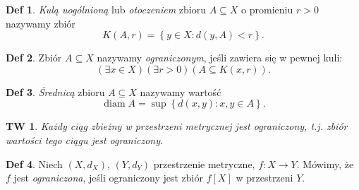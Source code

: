 \documentclass[a4paper, 12pt]{mwart}
\DeclareMathOperator{\diam}{diam}
\theoremstyle{definition}
\newtheorem{definicja}{Def}[section]
\theoremstyle{plain}
\newtheorem{twierdzenie}{TW}[section]
\theoremstyle{remark}
\begin{document}
\begin{definicja}
	\emph{Kulą uogólnioną} lub \emph{otoczeniem} zbioru $A \subseteq X$ o promieniu $r > 0$ nazywamy zbiór
	\begin{equation}
		K(A, r) = \left\{y \in X\colon d(y, A) < r\right\}.
	\end{equation}
\end{definicja}
\begin{definicja}
	Zbiór $A \subseteq X$ nazywamy \emph{ograniczonym}, jeśli zawiera się w pewnej kuli:
	\begin{equation}
		\left(\exists x \in X\right)\left(\exists r > 0\right)\left(A \subseteq K(x, r)\right).
	\end{equation}
\end{definicja}
\begin{definicja}
	\emph{Średnicą} zbioru $A \subseteq X$ nazywamy wartość
	\begin{equation}
		\diam A = \sup \left\{d(x, y)\colon x, y \in A \right\}.
	\end{equation}
\end{definicja}
\begin{twierdzenie}
	Każdy ciąg zbieżny w przestrzeni metrycznej jest ograniczony, t.j. zbiór wartości tego ciągu jest ograniczony.
\end{twierdzenie}
\begin{definicja}
	Niech $(X, d_X)$, $(Y, d_Y)$ \ppauza przestrzenie metryczne, $f\colon X \to Y$. Mówimy, że $f$ jest \emph{ograniczona}, jeśli ograniczony jest zbiór $f[X]$ w przestrzeni $Y$.
\end{definicja}
\end{document}
